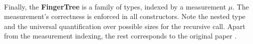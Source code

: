 \documentclass[12pt,twoside,notitlepage]{report}
\begin{document}
\begin{code}
\\
\>  \AgdaSymbol{\{}\AgdaSymbol{\}} \AgdaSymbol{(} \AgdaSymbol{:}  \AgdaSymbol{):}   \<%
\\
\>[0]\<[2]%
\>[2] \<[8]%
\>[8]\AgdaSymbol{:}    \<%
\\
\>[0]\<[2]%
\>[2] \<[8]%
\>[8]\AgdaSymbol{:}      \<%
\\
\>[0]\<[2]%
\>[2] \AgdaSymbol{:}        \<%
\\
\>[0]\<[2]%
\>[2] \<[8]%
\>[8]\AgdaSymbol{:}          \<%
\\
\end{code}

Finally, the \textbf{FingerTree} is a family of types, indexed by a measurement $\mu$. The measurement's correctness is enforced in all constructors. Note the nested type and the universal quantification over possible sizes for the recursive call. Apart from the measurement indexing, the rest corresponds to the original paper \cite{fingertrees}.
\end{document}
